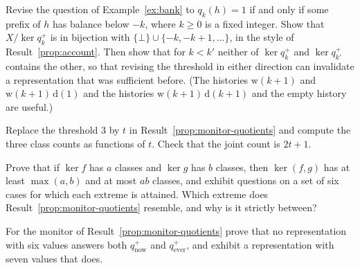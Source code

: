 \begin{exercise}
Revise the question of Example~\ref{ex:bank} to $q_{k}(h)=1$ if and only if some prefix of $h$ has balance below $-k$, where $k\ge0$ is a fixed integer. Show that $X/{\ker q_k^{+}}$ is in bijection with $\{\bot\}\cup\{-k,-k+1,\dots\}$, in the style of Result~\ref{prop:account}. Then show that for $k<k'$ neither of $\ker q_k^{+}$ and $\ker q_{k'}^{+}$ contains the other, so that revising the threshold in either direction can invalidate a representation that was sufficient before. (The histories $\mathrm{w}(k+1)$ and $\mathrm{w}(k+1)\,\mathrm{d}(1)$ and the histories $\mathrm{w}(k+1)\,\mathrm{d}(k+1)$ and the empty history are useful.)
\end{exercise}


\begin{exercise}
Replace the threshold $3$ by $t$ in Result~\ref{prop:monitor-quotients} and compute the three class counts as functions of $t$. Check that the joint count is $2t+1$.
\end{exercise}

\begin{exercise}
Prove that if $\ker f$ has $a$ classes and $\ker g$ has $b$ classes, then $\ker(f,g)$ has at least $\max(a,b)$ and at most $ab$ classes, and exhibit questions on a set of six cases for which each extreme is attained. Which extreme does Result~\ref{prop:monitor-quotients} resemble, and why is it strictly between?\label{ex:joint-classes}
\end{exercise}

\begin{exercise}
For the monitor of Result~\ref{prop:monitor-quotients} prove that no representation with six values answers both $q_{\mathrm{now}}^{+}$ and $q_{\mathrm{ever}}^{+}$, and exhibit a representation with seven values that does.
\end{exercise}

